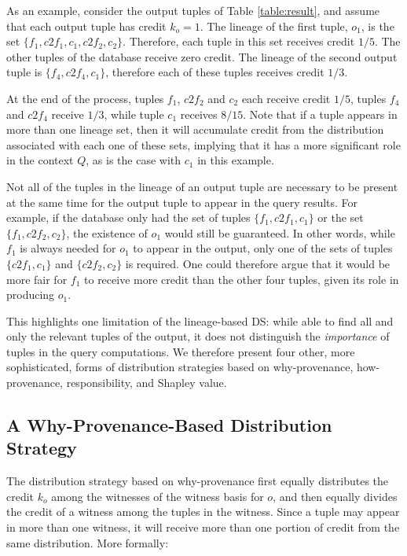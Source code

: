 \documentclass[preprint,12pt,sort&compress]{elsarticle}
\newcommand{\rtwo}[1]{\textcolor{reviewer2}{#1}}
\begin{document}
As an example, consider the output tuples of Table \ref{table:result}, and assume that each output tuple has credit $k_o = 1$.
The lineage of the first tuple, $o_1$, is the set $\{f_1, c2f_1, c_1, c2f_2, c_2\}$. Therefore, each tuple in this set receives credit $1/5$. The other tuples of the database receive zero credit.
The lineage of the second output tuple is $\{ f_4, c2f_4, c_1\}$, therefore each of these tuples receives credit $1/3$.

At the end of the process, tuples $f_1$, $c2f_2$ and $c_2$ each receive credit $1/5$, tuples $f_4$ and $c2f_4$ receive $1/3$, while tuple $c_1$ receives $8/15$.  
Note that if a tuple appears in more than one lineage set, then it will accumulate credit from the distribution associated with each one of these sets, implying that it has a more significant role in the context $Q$, as is the case with $c_1$ in this example.
 
Not all of the tuples in the lineage of an output tuple are necessary to be present at the same time for the output tuple to appear in the query results.  For example, if the database only had the set of  tuples $\{f_1, c2f_1, c_1\}$ or the set $\{f_1, c2f_2, c_2\}$, the existence of $o_1$ would still be guaranteed. 
In other words, while $f_1$ is always needed for $o_1$ to appear in the output, 
only one of the sets of tuples $\{ c2f_1, c_1 \}$ and $\{ c2f_2, c_2 \}$ is required. 
One could therefore argue that it would be more fair for $f_1$ to receive more credit than the other four tuples, given its role in producing $o_1$.  

This highlights one limitation of the lineage-based DS: while able to find all and only the relevant tuples of the output, it does not distinguish the \emph{importance} of tuples in the query computations. 
We therefore present four other, more sophisticated, forms of distribution strategies based on why-provenance, how-provenance, \rtwo{ responsibility, and Shapley value}.

\subsection{A Why-Provenance-Based Distribution Strategy}
The distribution strategy based on why-provenance first equally distributes the credit $k_o$ among the witnesses of the witness basis for $o$, and then equally divides the credit of a witness among the tuples in the witness. 
Since a tuple may appear in more than one witness, it will receive more than one portion of credit from the same distribution. More formally:
\end{document}
